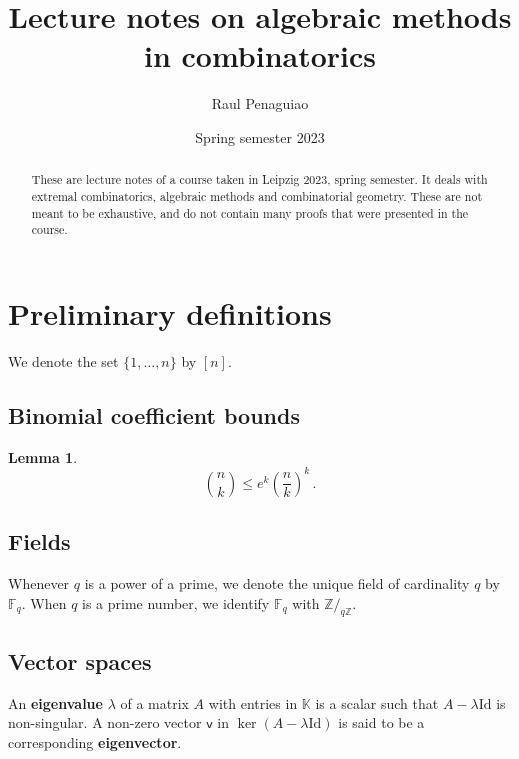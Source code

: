 \documentclass[12pt]{amsart}
\theoremstyle{definition}
\newtheorem{lm}[thm]{Lemma}
\newcommand{\Z}{\mathbb{Z}}
\newcommand{\F}{\mathbb{F}}
\newcommand{\K}{\mathbb{K}}
\newcommand{\vv}{\mathsf{v}}
\newcommand{\Id}{\mathrm{Id}}
\begin{document}
\title{Lecture notes on algebraic methods in combinatorics} %

\author{Raul Penaguiao}
\address{Max Planck Institute for the Sciences Leipzig}
\subjclass[2010]{}
\date{Spring semester 2023} %

\begin{abstract}
These are lecture notes of a course taken in Leipzig 2023, spring semester.
It deals with extremal combinatorics, algebraic methods and combinatorial geometry.
These are not meant to be exhaustive, and do not contain many proofs that were presented in the course.
\end{abstract}



\maketitle

\tableofcontents

\section{Preliminary definitions}

We denote the set $\{1, \dots, n\}$ by $[n]$.

\subsection{Binomial coefficient bounds}


\begin{lm}\label{lm:binom_bound}
$$\binom{n}{k} \leq e^k \left( \frac{n}{k} \right)^k \, . $$
\end{lm}

\subsection{Fields}
Whenever $q$ is a power of a prime, we denote the unique field of cardinality $q$ by $\F_q$.
When $q$ is a prime number, we identify $\F_q$ with $\Z/_{q\Z}$.


\subsection{Vector spaces}

An \textbf{eigenvalue} $\lambda$ of a matrix $A$ with entries in $\K$ is a scalar such that $A - \lambda \Id $ is non-singular.
A non-zero vector $\vv $ in $\ker (A - \lambda \Id)  $ is said to be a corresponding \textbf{eigenvector}.
\end{document}
